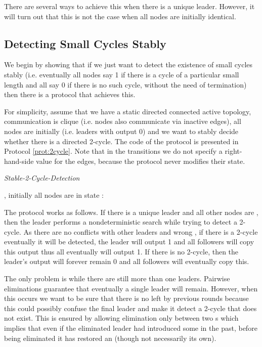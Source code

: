 \documentclass[preprint]{elsarticle}
\begin{document}
There are several ways to achieve this when there is a unique leader.
However, it will turn out that this is not the case when all nodes are initially
identical.

\subsection{Detecting Small Cycles Stably}

We begin by showing that if we just want to detect the existence of
small cycles stably (i.e. eventually all nodes say 1 if there is a cycle of a particular small length and all say 0
if there is no such cycle, without the need of termination) then there is a protocol that achieves this.

For simplicity, assume that we have a static directed connected active topology,
communication is clique (i.e. nodes also communicate via inactive edges),
all nodes are initially  (i.e. leaders with output 0) and we want to
stably decide whether there is a directed 2-cycle. The code of the protocol is presented in Protocol \ref{prot:2cycle}. Note that in the transitions we do not specify a right-hand-side value for the edges, because the protocol never modifies their state.

\renewcommand{\algorithmiccomment}[1]{// #1}
\begin{algorithm}[!h]
  \caption{\emph{Stable-2-Cycle-Detection}}\label{prot:2cycle}
  \begin{algorithmic}
    \medskip
    \State , initially all nodes are in state 
    \State : 
    
  \end{algorithmic}
\end{algorithm}

The protocol works as follows. If there is a unique leader  and all other nodes are , then the leader performs a nondeterministic search while trying to detect a 2-cycle. As there are no
conflicts with other leaders and wrong , if there is a 2-cycle
eventually it will be detected, the leader will output 1 and all followers
will copy this output thus all eventually will output 1. If there is no
2-cycle, then the leader's output will forever remain 0 and all followers
will eventually copy this.

The only problem is while there are still more than one leaders. Pairwise
eliminations guarantee that eventually a single leader will remain.
However, when this occurs we want to be sure that there is no  left by
previous rounds because this could possibly confuse the final leader and make it
detect a 2-cycle that does not exist. This is ensured by allowing
elimination only between two s which implies that even if the eliminated
leader had introduced some  in the past, before being eliminated it has
restored an  (though not necessarily its own). 
\end{document}
